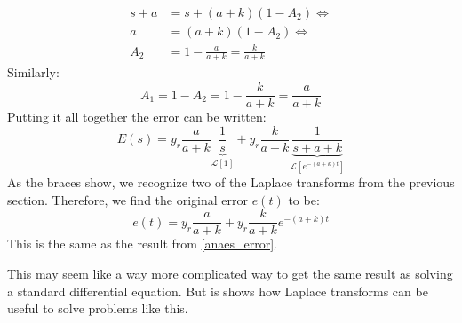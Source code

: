 \documentclass[12pt, a4paper]{article}
\numberwithin{equation}{section}
\begin{document}
\begin{align}
s+a&=s+(a+k)(1-A_2)\Leftrightarrow\\
a&=(a+k)(1-A_2)\Leftrightarrow\\
A_2&=1-\frac{a}{a+k}=\frac{k}{a+k}
\end{align}
Similarly:
\begin{equation}
A_1=1-A_2=1-\frac{k}{a+k}=\frac{a}{a+k}
\end{equation}
Putting it all together the error can be written:
\begin{equation}
E(s)=y_r\frac{a}{a+k}\underbrace{\frac{1}{s}}_{\mathcal{L}[1]}+y_r\frac{k}{a+k}\underbrace{\frac{1}{s+a+k}}_{\mathcal{L}[e^{-(a+k)t}]}
\end{equation}
As the braces show, we recognize two of the Laplace transforms from the previous section. Therefore, we find the original error $e(t)$ to be:
\begin{equation}
e(t)=y_r\frac{a}{a+k}+y_r\frac{k}{a+k}e^{-(a+k)t}
\end{equation}
This is the same as the result from \ref{anaes_error}.

This may seem like a way more complicated way to get the same result as solving a standard differential equation. But is shows how Laplace transforms can be useful to solve problems like this.
\end{document}
